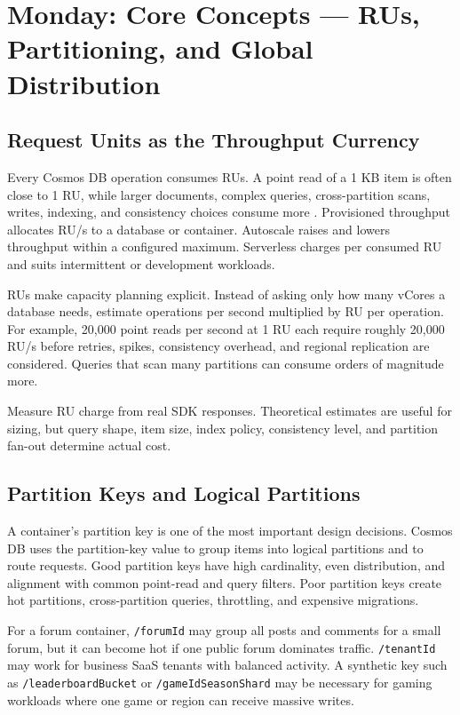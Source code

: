 \section{Monday: Core Concepts --- RUs, Partitioning, and Global Distribution}

\subsection{Request Units as the Throughput Currency}
Every Cosmos DB operation consumes RUs. A point read of a 1 KB item is often close to 1 RU, while larger documents, complex queries, cross-partition scans, writes, indexing, and consistency choices consume more \cite{microsoft2025cosmosRequestUnits}. Provisioned throughput allocates RU/s to a database or container. Autoscale raises and lowers throughput within a configured maximum. Serverless charges per consumed RU and suits intermittent or development workloads.

RUs make capacity planning explicit. Instead of asking only how many vCores a database needs, estimate operations per second multiplied by RU per operation. For example, 20,000 point reads per second at 1 RU each require roughly 20,000 RU/s before retries, spikes, consistency overhead, and regional replication are considered. Queries that scan many partitions can consume orders of magnitude more.

\begin{tipbox}
Measure RU charge from real SDK responses. Theoretical estimates are useful for sizing, but query shape, item size, index policy, consistency level, and partition fan-out determine actual cost.
\end{tipbox}

\subsection{Partition Keys and Logical Partitions}
A container's partition key is one of the most important design decisions. Cosmos DB uses the partition-key value to group items into logical partitions and to route requests. Good partition keys have high cardinality, even distribution, and alignment with common point-read and query filters. Poor partition keys create hot partitions, cross-partition queries, throttling, and expensive migrations.

For a forum container, \texttt{/forumId} may group all posts and comments for a small forum, but it can become hot if one public forum dominates traffic. \texttt{/tenantId} may work for business SaaS tenants with balanced activity. A synthetic key such as \texttt{/leaderboardBucket} or \texttt{/gameIdSeasonShard} may be necessary for gaming workloads where one game or region can receive massive writes.

